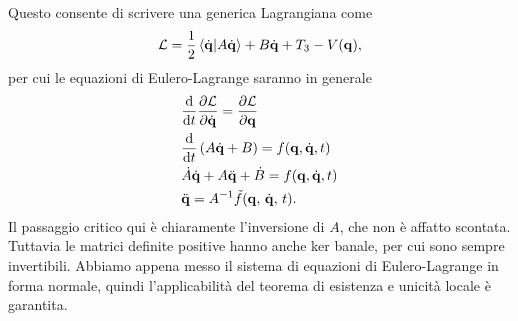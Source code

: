     Questo consente di scrivere una generica Lagrangiana come
    \begin{equation}
        \mathcal{L} = \frac{1}{2}\braket{\dot{\mathbf{q}}|A\dot{\mathbf{q}}} + B \dot{\mathbf{q}} + T_3-V(\mathbf{q}),
    \end{equation}
    per cui le equazioni di Eulero-Lagrange saranno in generale
    \begin{equation}
       \begin{aligned}
           &\frac{\mathrm{d}}{\mathrm{d}t} \frac{\partial \mathcal{L}}{\partial \dot{\mathbf{q}}} = \frac{\partial{\mathcal{L}}}{{\partial \mathbf{q}}}\\
           &\frac{\mathrm{d}}{\mathrm{d}t}\left(A\dot{\mathbf{q}}+B\right) = f(\mathbf{q},\dot{\mathbf{q}},t)\\
           &\dot{A}\dot{\mathbf{q}}+A\ddot{\mathbf{q}}+\dot{B} = f(\mathbf{q},\dot{\mathbf{q}},t)\\
           &\ddot{\mathbf{q}} = A^{-1}\tilde{f}(\mathbf{q},\,\dot{\mathbf{q}},\,t).
       \end{aligned}
    \end{equation}
    Il passaggio critico qui è chiaramente l'inversione di $A$, che non è affatto scontata. Tuttavia le matrici definite positive hanno anche ker banale, per cui sono sempre invertibili. Abbiamo appena messo il sistema di equazioni di Eulero-Lagrange in forma normale, quindi l'applicabilità del teorema di esistenza e unicità locale è garantita.
